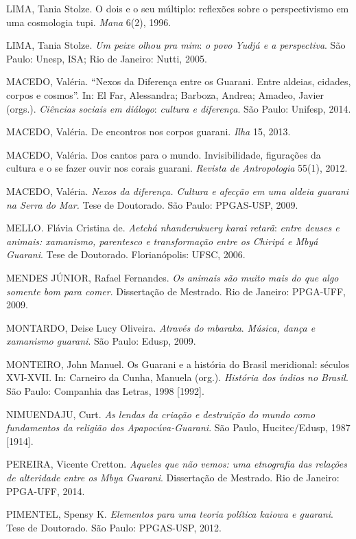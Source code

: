 LIMA, Tania Stolze. O dois e o seu múltiplo: reflexões sobre o
perspectivismo em uma cosmologia tupi. \emph{Mana} 6(2), 1996.

LIMA, Tania Stolze. \emph{Um peixe olhou pra mim}: \emph{o povo Yudjá e
a perspectiva}. São Paulo: Unesp, ISA; Rio de Janeiro: Nutti, 2005.

MACEDO, Valéria. ``Nexos da Diferença entre os Guarani\emph{.} Entre
aldeias, cidades, corpos e cosmos''. In: El Far, Alessandra; Barboza,
Andrea; Amadeo, Javier (orgs.). \emph{Ciências sociais em diálogo}:
\emph{cultura e diferença}. São Paulo: Unifesp, 2014.

MACEDO, Valéria. De encontros nos corpos guarani. \emph{Ilha} 15, 2013.

MACEDO, Valéria. Dos cantos para o mundo. Invisibilidade, figurações da
cultura e o se fazer ouvir nos corais guarani. \emph{Revista de
Antropologia} 55(1), 2012.

MACEDO, Valéria. \emph{Nexos da diferença. Cultura e afecção em uma
aldeia guarani na Serra do Mar.} Tese de Doutorado. São Paulo:
PPGAS-USP, 2009.

MELLO. Flávia Cristina de. \emph{Aetchá nhanderukuery karai retarã}:
\emph{entre deuses e animais: xamanismo, parentesco e transformação
entre os Chiripá e Mbyá Guarani}. Tese de Doutorado. Florianópolis:
UFSC, 2006.

MENDES JÚNIOR, Rafael Fernandes. \emph{Os animais são muito mais do que
algo somente bom para comer}. Dissertação de Mestrado. Rio de Janeiro:
PPGA-UFF, 2009.

MONTARDO, Deise Lucy Oliveira. \emph{Através do mbaraka}. \emph{Música,
dança e xamanismo guarani}. São Paulo: Edusp, 2009.

MONTEIRO, John Manuel. Os Guarani e a história do Brasil meridional:
séculos XVI-XVII. In: Carneiro da Cunha, Manuela (org.). \emph{História
dos índios no Brasil}. São Paulo: Companhia das Letras, 1998 {[}1992{]}.

NIMUENDAJU, Curt. \emph{As lendas da criação e destruição do mundo como
fundamentos da religião dos Apapocúva-Guarani}. São Paulo,
Hucitec/Edusp, 1987 {[}1914{]}.

PEREIRA, Vicente Cretton. \emph{Aqueles que não vemos: uma etnografia
das relações de alteridade entre os Mbya Guarani}. Dissertação de
Mestrado. Rio de Janeiro: PPGA-UFF, 2014.

PIMENTEL, Spensy K. \emph{Elementos para uma teoria política kaiowa e
guarani}. Tese de Doutorado. São Paulo: PPGAS-USP, 2012.

